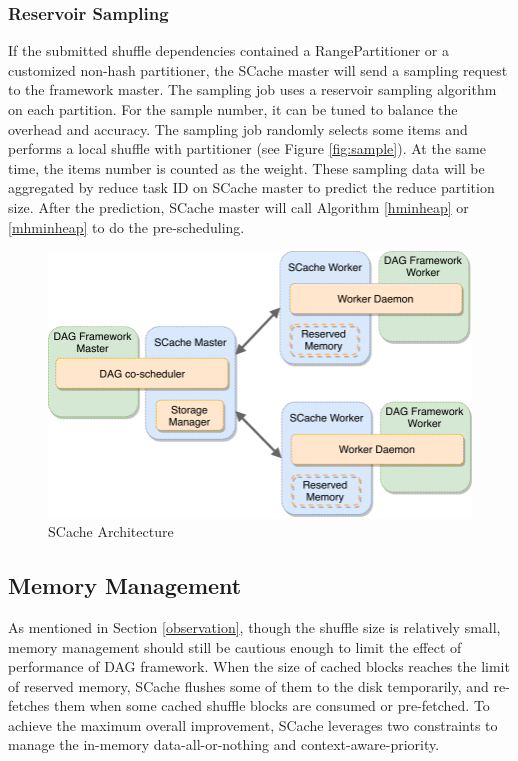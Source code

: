 \subsubsection{Reservoir Sampling}\label{sampling}
If the submitted shuffle dependencies contained a RangePartitioner or a customized non-hash partitioner, {\color{blue}the SCache master will send a sampling request to the framework master}. 
The sampling job uses a reservoir sampling algorithm \cite{reservoir} on each partition. 
For the sample number, it can be tuned to balance the overhead and accuracy. 
The sampling job randomly selects some items and performs a local shuffle with partitioner (see Figure \ref{fig:sample}). 
At the same time, the items number is counted as the weight. 
These sampling data will be aggregated by reduce task ID on SCache master to predict the reduce partition size. 
After the prediction, SCache master will call Algorithm \ref{hminheap} or \ref{mhminheap} to do the pre-scheduling.


\begin{figure}
	\centering
	\includegraphics[width=0.8\linewidth]{fig/architecture}
	\caption{\color{blue}SCache Architecture}
	\label{fig:architecture}
\end{figure}

\subsection{Memory Management}\label{memorymanage}
As mentioned in Section \ref{observation}, though the shuffle size is relatively small, memory management should still be cautious enough to limit the effect of performance of DAG framework.
When the size of cached blocks reaches the limit of reserved memory, SCache flushes some of them to the disk temporarily, and re-fetches them when some cached shuffle blocks are consumed or pre-fetched. 
To achieve the maximum overall improvement, SCache leverages two constraints to manage the in-memory data-all-or-nothing and context-aware-priority.

